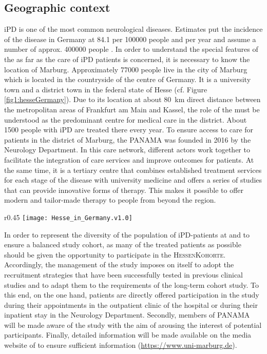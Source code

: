 \subsection{Geographic context}
\ac{iPD} is one of the most common neurological diseases. Estimates put the incidence of the disease in Germany at \SI{84.1}{} per \num[round-precision = 0, round-mode = places]{100000}{} people and per year and assume a number of approx. \num[round-precision = 0, round-mode = places]{400000}{} people \cite{nerius2017parkinson}. In order to understand the special features of the \UKGM as far as the care of \ac{iPD} patients is concerned, it is necessary to know the location of Marburg. Approximately \SI[round-precision = 0, round-mode=places]{77000}{} people live in the city of Marburg which is located in the countryside of the centre of Germany. It is a university town and a district town in the federal state of Hesse (cf. Figure \ref{fig1:hesseGermany}). Due to its location at about \SI{80}{\km} direct distance between the metropolitan areas of Frankfurt am Main and Kassel, the role of the \UKGM must be understood as the predominant centre for medical care in the district. About \num[round-precision = 0, round-mode = places]{1500}{} people with \ac{iPD} are treated there every year. To ensure access to care for patients in the district of Marburg, the \ac{PANAMA} was founded in 2016 by the Neurology Department. In this care network, different actors work together to facilitate the integration of care services and improve outcomes for patients. At the same time, it is a tertiary centre that combines established treatment services for each stage of the disease with university medicine and offers a series of studies that can provide innovative forms of therapy. This makes it possible to offer modern and tailor-made therapy to people from beyond the region.

\begin{wrapfigure}{r}{0.45\textwidth} %
    \label{fig1:hesseGermany}
    \centering
    \texttt{[image: Hesse\_in\_Germany.v1.0]}
    \caption{Location of Hesse in the German Federal Republic}
\end{wrapfigure}

In order to represent the diversity of the population of \ac{iPD}-patients at \UKGM and to ensure a balanced study cohort, as many of the treated patients as possible should be given the opportunity to participate in the \textsc{HessenKohorte}. Accordingly, the management of the study imposes on itself to adopt the recruitment strategies that have been successfully tested in previous clinical studies and to adapt them to the requirements of the long-term cohort study. To this end, on the one hand, patients are directly offered participation in the study during their appointments in the outpatient clinic of the hospital or during their inpatient stay in the Neurology Department. Secondly, members of \ac{PANAMA} will be made aware of the study with the aim of arousing the interest of potential participants. Finally, detailed information will be made available on the media website of \UKGM to ensure sufficient information (\url{https://www.uni-marburg.de}).
\newpage

